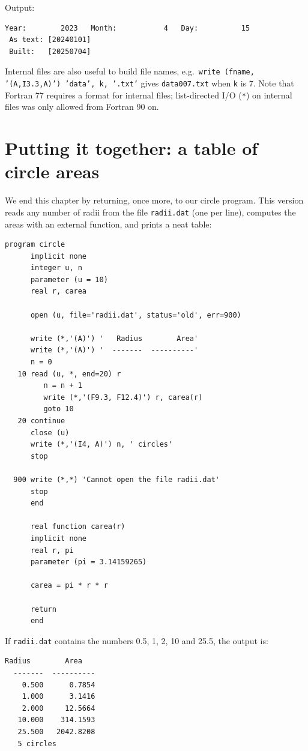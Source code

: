 Output:

\begin{lstlisting}[style=output]
 Year:        2023   Month:           4   Day:          15
 As text: [20240101]
 Built:   [20250704]
\end{lstlisting}

Internal files are also useful to build file names, e.g.\ \texttt{write (fname, '(A,I3.3,A)') 'data', k, '.txt'} gives \texttt{data007.txt} when \texttt{k} is 7. Note that Fortran 77 requires a format for internal files; list-directed I/O (\texttt{*}) on internal files was only allowed from Fortran 90 on.

\section{Putting it together: a table of circle areas}

We end this chapter by returning, once more, to our circle program. This version reads any number of radii from the file \texttt{radii.dat} (one per line), computes the areas with an external function, and prints a neat table:

\begin{lstlisting}[style=fortran77]
      program circle
      implicit none
      integer u, n
      parameter (u = 10)
      real r, carea

      open (u, file='radii.dat', status='old', err=900)

      write (*,'(A)') '   Radius        Area'
      write (*,'(A)') '  -------  ----------'
      n = 0
   10 read (u, *, end=20) r
         n = n + 1
         write (*,'(F9.3, F12.4)') r, carea(r)
         goto 10
   20 continue
      close (u)
      write (*,'(I4, A)') n, ' circles'
      stop

  900 write (*,*) 'Cannot open the file radii.dat'
      stop
      end

      real function carea(r)
      implicit none
      real r, pi
      parameter (pi = 3.14159265)

      carea = pi * r * r

      return
      end
\end{lstlisting}

If \texttt{radii.dat} contains the numbers 0.5, 1, 2, 10 and 25.5, the output is:

\begin{lstlisting}[style=output]
   Radius        Area
  -------  ----------
    0.500      0.7854
    1.000      3.1416
    2.000     12.5664
   10.000    314.1593
   25.500   2042.8208
   5 circles
\end{lstlisting}

